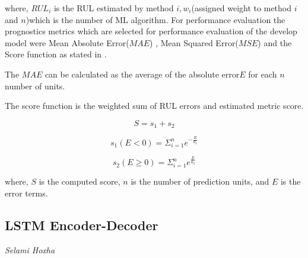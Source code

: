where, $RUL_i$ is the RUL estimated by method $i,w_i$(assigned weight to method $i$ and $n$)which is the number of ML algorithm. For performance evaluation
the prognostics metrics which are selected for performance evaluation of the develop model were Mean Absolute Error($MAE$) , Mean Squared Error($MSE$) and
the Score function as stated in \cite{Mutunga2019HealthIndexBP}.



The $MAE$ can be calculated as the average of the absolute error$E$ for each $n$ number of units.



The score function is the weighted sum of RUL errors and estimated metric score.

\begin{equation}
    S=s_1+s_2
\end{equation}

\begin{equation}
    s_1(E<0)=\Sigma_{i=1}^n e^{-\frac{E}{a_1}}
\end{equation}

\begin{equation}
    s_2(E\geq0)=\Sigma_{i=1}^n e^{\frac{E}{a_2}}
\end{equation}

where,
$S$ is the computed score, $n$ is the number of prediction units, and $E$ is the error terms.


\subsection{LSTM Encoder-Decoder}
\vspace*{-12.5mm}\hfill{\normalsize\emph{Selami Hoxha}}
\label{sec:hi_estimation:approaches:lstmencoder}

